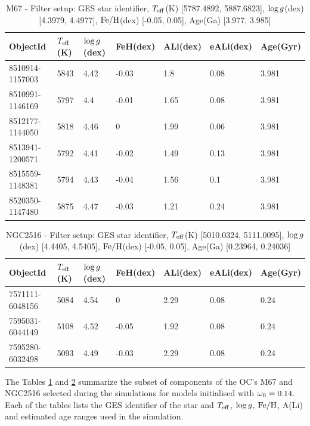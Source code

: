 \documentclass[fleqn,usenatbib]{mnras}
\begin{document}
\begin{table}
	\centering
	\begin{tabular}{l l l l l l l} 
		\hline
            ObjectId & $T_{\mathrm{eff}}$(K) & $\mathrm{log} \, g$(dex) & FeH(dex) & ALi(dex) & eALi(dex) & Age(Gyr)\\
		\hline
            8510914-1157003 & 5843 & 4.42 & -0.03 & 1.8 & 0.08 & 3.981\\ 
            8510991-1146169 & 5797 & 4.4 & -0.01 & 1.65 & 0.08 & 3.981\\ 
            8512177-1144050 & 5818 & 4.46 & 0 & 1.99 & 0.06 & 3.981\\ 
            8513941-1200571 & 5792 & 4.41 & -0.02 & 1.49 & 0.13 & 3.981\\ 
            8515559-1148381 & 5794 & 4.43 & -0.04 & 1.56 & 0.1 & 3.981\\ 
            8520350-1147480 & 5875 & 4.47 & -0.03 & 1.21 & 0.24 & 3.981\\ 
            \hline
	\end{tabular}
 	\caption{M67 - Filter setup: GES star identifier, $T_{\mathrm{eff}}$(K) [5787.4892, 5887.6823], $\mathrm{log} \, g$(dex) [4.3979, 4.4977], $\mathrm{Fe}/\mathrm{H}$(dex) [-0.05, 0.05], Age(Ga) [3.977, 3.985]}
	\label{tab:oc_m67}
\end{table}

\begin{table}
	\centering
	\begin{tabular}{l l l l l l l} 
		\hline
            ObjectId & $T_{\mathrm{eff}}$(K) & $\mathrm{log} \, g$(dex) & FeH(dex) & ALi(dex) & eALi(dex) & Age(Gyr)\\
		\hline
            7571111-6048156 & 5084 & 4.54 & 0 & 2.29 & 0.08 & 0.24\\ 
            7595031-6044149 & 5108 & 4.52 & -0.05 & 1.92 & 0.08 & 0.24\\ 
            7595280-6032498 & 5093 & 4.49 & -0.03 & 2.29 & 0.08 & 0.24\\ 
            \hline
	\end{tabular}
 	\caption{NGC2516 - Filter setup: GES star identifier, $T_{\mathrm{eff}}$(K) [5010.0324, 5111.0095], $\mathrm{log} \, g$(dex) [4.4405, 4.5405], $\mathrm{Fe}/\mathrm{H}$(dex) [-0.05, 0.05], Age(Ga) [0.23964, 0.24036]}\label{tab:oc_ngc2516}

\end{table}

The Tables \ref{tab:oc_m67} and \ref{tab:oc_ngc2516} summarize the subset of components of the OC's M67 and NGC2516 selected during the simulations for models initialised with $\omega_{\mathrm{0}} = 0.14$. Each of the tables lists the GES identifier of the star and $T_{\mathrm{eff}}$, $\mathrm{log} \, g$, $\mathrm{Fe}/\mathrm{H}$, A(Li) and estimated age ranges used in the simulation.
\end{document}
